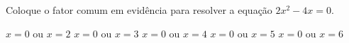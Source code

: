 Coloque o fator comum em evidência para resolver a equação $2x^2-4x=0$.

$x=0$ ou $x=2$
$x=0$ ou $x=3$
$x=0$ ou $x=4$
$x=0$ ou $x=5$
$x=0$ ou $x=6$


